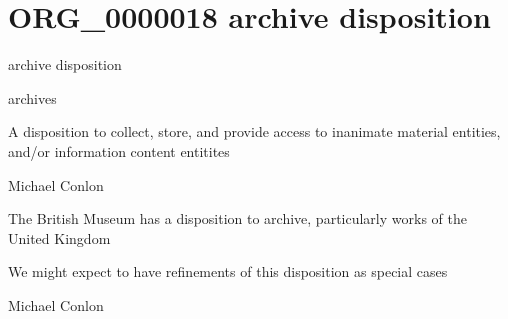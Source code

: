 \documentclass[letterpaper,10pt,english]{sphinxmanual}
\begin{document}
\section{ORG\_0000018 \sphinxhyphen{} archive disposition}
\label{\detokenize{doc-ORG_0000018:org-0000018-archive-disposition}}\label{\detokenize{doc-ORG_0000018:index-0}}\label{\detokenize{doc-ORG_0000018::doc}}
\begin{sphinxShadowBox}

\sphinxAtStartPar
archive disposition
\end{sphinxShadowBox}

\begin{sphinxShadowBox}

\sphinxAtStartPar
archives
\end{sphinxShadowBox}

\begin{sphinxShadowBox}

\sphinxAtStartPar
A disposition to collect, store, and provide access to inanimate material entities, and/or information content entitites
\end{sphinxShadowBox}

\begin{sphinxShadowBox}

\sphinxAtStartPar
Michael Conlon 
\end{sphinxShadowBox}

\begin{sphinxShadowBox}

\sphinxAtStartPar
The British Museum has a disposition to archive, particularly works of the United Kingdom
\end{sphinxShadowBox}

\begin{sphinxShadowBox}

\sphinxAtStartPar
We might expect to have refinements of this disposition as special cases
\end{sphinxShadowBox}

\begin{sphinxShadowBox}

\sphinxAtStartPar
Michael Conlon 
\end{sphinxShadowBox}
\begin{quote}
\label{\detokenize{doc-ORG_0000019:org-0000019}}\label{\detokenize{doc-ORG_0000019:museum-disposition}}\label{\detokenize{doc-ORG_0000019:org-0000019}}
\ignorespaces \end{quote}
\end{document}
